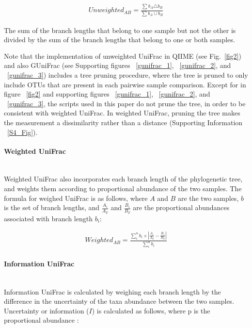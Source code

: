 \documentclass[10pt,letterpaper]{article}
\begin{document}
\begin{align*}
Unweighted_{AB} = \frac{\sum_{}{} b_{A} \triangle b_{B}}{\sum_{}{} b_{A} \cup b_{B}}
\end{align*}

The sum of the branch lengths that belong to one sample but not the other is divided by the sum of the branch lengths that belong to one or both samples.

Note that the implementation of unweighted UniFrac in QIIME (see Fig.~\ref{fig2}) and also GUniFrac (see Supporting figures ~\ref{gunifrac_1}, ~\ref{gunifrac_2}, and ~\ref{gunifrac_3}) includes a tree pruning procedure, where the tree is pruned to only include OTUs that are present in each pairwise sample comparison. Except for in figure ~\ref{fig2} and supporting figures ~\ref{gunifrac_1}, ~\ref{gunifrac_2}, and ~\ref{gunifrac_3}, the scripts used in this paper do not prune the tree, in order to be consistent with weighted UniFrac. In weighted UniFrac, pruning the tree makes the measurement a dissimilarity rather than a distance (Supporting Information ~\ref{S4_Fig}).

\paragraph{Weighted UniFrac}\mbox{}\\
Weighted UniFrac \cite{lozupone2007quantitative} also incorporates each branch length of the phylogenetic tree, and weights them according to proportional abundance of the two samples. The formula for weighed UniFrac is as follows, where $A$ and $B$ are the two samples, $b$ is the set of branch lengths, and $\frac{A_{i}}{A_{T}}$ and $\frac{B_{i}}{B_{T}}$ are the proportional abundances associated with branch length $b_{i}$:

\begin{align*}
Weighted_{AB} = \frac{\sum_{i}^{n} b_{i} \times \left| \frac{A_{i}}{A_{T}} - \frac{B_{i}}{B_{T}} \right|}{\sum_{i}^{n} b_{i}}
\end{align*}

\paragraph{Information UniFrac}\mbox{}\\
Information UniFrac is calculated by weighing each branch length by the difference in the uncertainty of the taxa abundance between the two samples. Uncertainty or information ($I$) is calculated as follows, where p is the proportional abundance \cite{shannon2001mathematical}:
\end{document}
